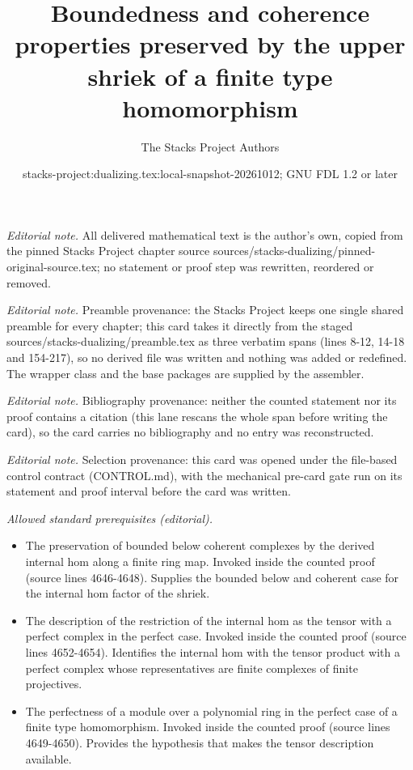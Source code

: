 \documentclass[10pt,a4paper]{amsart}
\title{Boundedness and coherence properties preserved by the upper shriek of a finite type homomorphism}
\author{The Stacks Project Authors}
\date{stacks-project:dualizing.tex:local-snapshot-20261012; GNU FDL 1.2 or later}
\theoremstyle{plain}
\theoremstyle{definition}
\theoremstyle{remark}
\numberwithin{equation}{subsection}
\begin{document}
\maketitle
\noindent\textit{Editorial note.} All delivered mathematical text is the author's own, copied from the pinned Stacks Project chapter source sources/stacks-dualizing/pinned-original-source.tex; no statement or proof step was rewritten, reordered or removed.\par\medskip
\noindent\textit{Editorial note.} Preamble provenance: the Stacks Project keeps one single shared preamble for every chapter; this card takes it directly from the staged sources/stacks-dualizing/preamble.tex as three verbatim spans (lines 8-12, 14-18 and 154-217), so no derived file was written and nothing was added or redefined. The wrapper class and the base packages are supplied by the assembler.\par\medskip
\noindent\textit{Editorial note.} Bibliography provenance: neither the counted statement nor its proof contains a citation (this lane rescans the whole span before writing the card), so the card carries no bibliography and no entry was reconstructed.\par\medskip
\noindent\textit{Editorial note.} Selection provenance: this card was opened under the file-based control contract (CONTROL.md), with the mechanical pre-card gate run on its statement and proof interval before the card was written.\par\medskip
\noindent\textit{Allowed standard prerequisites (editorial).}\begin{itemize}
\item The preservation of bounded below coherent complexes by the derived internal hom along a finite ring map. Invoked inside the counted proof (source lines 4646-4648). Supplies the bounded below and coherent case for the internal hom factor of the shriek.
\item The description of the restriction of the internal hom as the tensor with a perfect complex in the perfect case. Invoked inside the counted proof (source lines 4652-4654). Identifies the internal hom with the tensor product with a perfect complex whose representatives are finite complexes of finite projectives.
\item The perfectness of a module over a polynomial ring in the perfect case of a finite type homomorphism. Invoked inside the counted proof (source lines 4649-4650). Provides the hypothesis that makes the tensor description available.
\end{itemize}\medskip
\end{document}
